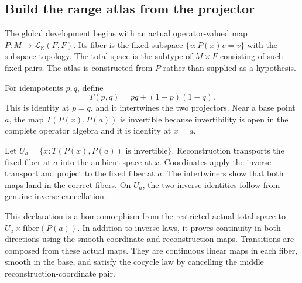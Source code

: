 


\subsection{Build the range atlas from the projector}
The global development begins with an actual operator-valued map $P:M\to\mathcal L_{\mathbb R}(F,F)$. Its fiber is the fixed subspace $\{v:P(x)v=v\}$ with the subspace topology. The total space is the subtype of $M\times F$ consisting of such fixed pairs. The atlas is constructed from $P$ rather than supplied as a hypothesis.

For idempotents $p,q$, define
\[
T(p,q)=pq+(1-p)(1-q).
\]
This is identity at $p=q$, and it intertwines the two projectors. Near a base point $a$, the map $T(P(x),P(a))$ is invertible because invertibility is open in the complete operator algebra and it is identity at $x=a$.


Let $U_a=\{x:T(P(x),P(a))\text{ is invertible}\}$. Reconstruction transports the fixed fiber at $a$ into the ambient space at $x$. Coordinates apply the inverse transport and project to the fixed fiber at $a$. The intertwiners show that both maps land in the correct fibers. On $U_a$, the two inverse identities follow from genuine inverse cancellation.


This declaration is a homeomorphism from the restricted actual total space to $U_a\times\mathrm{fiber}(P(a))$. In addition to inverse laws, it proves continuity in both directions using the smooth coordinate and reconstruction maps. Transitions are composed from these actual maps. They are continuous linear maps in each fiber, smooth in the base, and satisfy the cocycle law by cancelling the middle reconstruction-coordinate pair.

